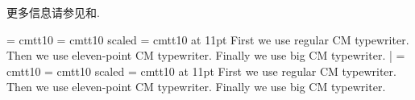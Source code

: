 更多信息请参见和.

\example
\font\tentt = cmtt10
\font\bigttfont = cmtt10 scaled 
\font\eleventtfont = cmtt10 at 11pt
First we use {\tentt regular CM typewriter}.
Then we use {\eleventtfont eleven-point CM typewriter}.
Finally we use {\bigttfont big CM typewriter}.
|
\produces
\font\regttfont = cmtt10
\font\bigttfont = cmtt10 scaled 
\font\eleventtfont = cmtt10 at 11pt
First we use {\regttfont regular CM typewriter}.
Then we use {\eleventtfont eleven-point CM typewriter}.
Finally we use {\bigttfont big CM typewriter}.
\endexample
\enddesc

